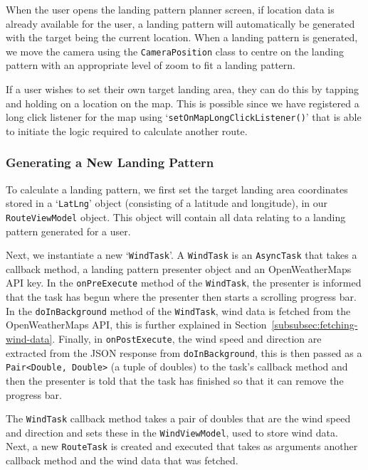 When the user opens the landing pattern planner screen, if location data is already available for the user, a landing pattern will automatically be generated with the target being the current location. When a landing pattern is generated, we move the camera using the \texttt{CameraPosition} class to centre on the landing pattern with an appropriate level of zoom to fit a landing pattern.

If a user wishes to set their own target landing area, they can do this by tapping and holding on a location on the map. This is possible since we have registered a long click listener for the map using `\texttt{setOnMapLongClickListener()}' that is able to initiate the logic required to calculate another route.

\subsubsection{Generating a New Landing Pattern}
To calculate a landing pattern, we first set the target landing area coordinates stored in a `\texttt{LatLng}' object (consisting of a latitude and longitude), in our \texttt{RouteViewModel} object. This object will contain all data relating to a landing pattern generated for a user.

Next, we instantiate a new `\texttt{WindTask}'. A \texttt{WindTask} is an \texttt{AsyncTask} that takes a callback method, a landing pattern presenter object and an OpenWeatherMaps API key. In the \texttt{onPreExecute} method of the \texttt{WindTask}, the presenter is informed that the task has begun where the presenter then starts a scrolling progress bar. In the \texttt{doInBackground} method of the \texttt{WindTask}, wind data is fetched from the OpenWeatherMaps API, this is further explained in Section~\vref{subsubsec:fetching-wind-data}. Finally, in \texttt{onPostExecute}, the wind speed and direction are extracted from the JSON response from \texttt{doInBackground}, this is then passed as a \texttt{Pair<Double, Double>} (a tuple of doubles) to the task's callback method and then the presenter is told that the task has finished so that it can remove the progress bar.

The \texttt{WindTask} callback method takes a pair of doubles that are the wind speed and direction and sets these in the \texttt{WindViewModel}, used to store wind data. Next, a new \texttt{RouteTask} is created and executed that takes as arguments another callback method and the wind data that was fetched.

